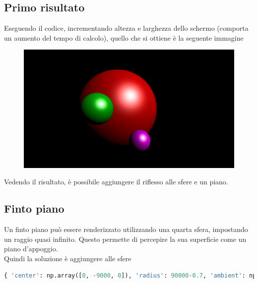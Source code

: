 \documentclass[9pt,a4paper,twoside]{tau}
\begin{document}
\subsection{Primo risultato}
Eseguendo il codice, incrementando altezza e larghezza dello schermo (comporta un aumento del tempo di calcolo), quello che si ottiene è la seguente immagine
\begin{figure}[H]
    \centering
    \includegraphics[width=0.7\columnwidth]{Figures/19.png}
    \caption{}
    \label{fig:figure}
\end{figure}
Vedendo il risultato, è possibile aggiungere il riflesso alle sfere e un piano.

\subsection{Finto piano}
Un finto piano può essere renderizzato utilizzando una quarta sfera, impostando un raggio quasi infinito. Questo permette di percepire la sua superficie come un piano d'appoggio.	\\
Quindi la soluzione è aggiungere alle sfere
\begin{lstlisting}[language=Python]
{ 'center': np.array([0, -9000, 0]), 'radius': 90000-0.7, 'ambient': np.array([0.1, 0.1, 0.1]), 'diffuse': np.array([0.6, 0.6, 0.6]), 'specular': np.array([1, 1, 1]), 'shininess': 100, 'reflection': 0.5 }
\end{lstlisting}
\end{document}
